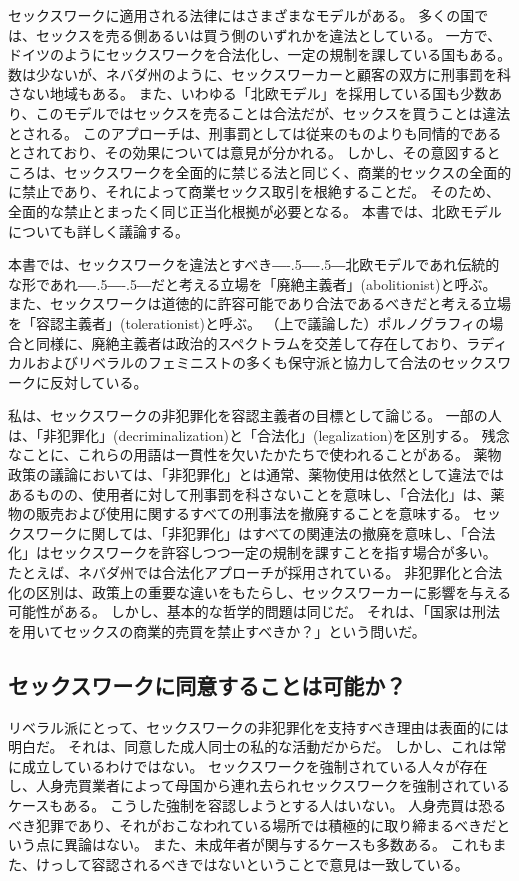 \documentclass[paper=a4,book,openany]{jlreq}
\def\DDASH{―\kern-.5\zw―\kern-.5\zw―}
\begin{document}
セックスワークに適用される法律にはさまざまなモデルがある。
多くの国では、セックスを売る側あるいは買う側のいずれかを違法としている。
一方で、ドイツのようにセックスワークを合法化し、一定の規制を課している国もある。
数は少ないが、ネバダ州のように、セックスワーカーと顧客の双方に刑事罰を科さない地域もある。
また、いわゆる「北欧モデル」を採用している国も少数あり、このモデルではセックスを売ることは合法だが、セックスを買うことは違法とされる。
このアプローチは、刑事罰としては従来のものよりも同情的であるとされており、その効果については意見が分かれる。
しかし、その意図するところは、セックスワークを全面的に禁じる法と同じく、商業的セックスの全面的に禁止であり、それによって商業セックス取引を根絶することだ。
そのため、全面的な禁止とまったく同じ正当化根拠が必要となる。
本書では、北欧モデルについても詳しく議論する。

本書では、セックスワークを違法とすべき{\DDASH}北欧モデルであれ伝統的な形であれ{\DDASH}だと考える立場を「廃絶主義者」(abolitionist)と呼ぶ。
また、セックスワークは道徳的に許容可能であり合法であるべきだと考える立場を「容認主義者」(tolerationist)と呼ぶ。
（上で議論した）ポルノグラフィの場合と同様に、廃絶主義者は政治的スペクトラムを交差して存在しており、ラディカルおよびリベラルのフェミニストの多くも保守派と協力して合法のセックスワークに反対している。

私は、セックスワークの非犯罪化を容認主義者の目標として論じる。
一部の人は、「非犯罪化」(decriminalization)と「合法化」(legalization)を区別する。
残念なことに、これらの用語は一貫性を欠いたかたちで使われることがある。
薬物政策の議論においては、「非犯罪化」とは通常、薬物使用は依然として違法ではあるものの、使用者に対して刑事罰を科さないことを意味し、「合法化」は、薬物の販売および使用に関するすべての刑事法を撤廃することを意味する。
セックスワークに関しては、「非犯罪化」はすべての関連法の撤廃を意味し、「合法化」はセックスワークを許容しつつ一定の規制を課すことを指す場合が多い。
たとえば、ネバダ州では合法化アプローチが採用されている。
非犯罪化と合法化の区別は、政策上の重要な違いをもたらし、セックスワーカーに影響を与える可能性がある。
しかし、基本的な哲学的問題は同じだ。
それは、「国家は刑法を用いてセックスの商業的売買を禁止すべきか？」という問いだ\citep{tani15:_sex_worker_explain_differ_legal_decrim_prost}。

\subsection{セックスワークに同意することは可能か？}

リベラル派にとって、セックスワークの非犯罪化を支持すべき理由は表面的には明白だ。
それは、同意した成人同士の私的な活動だからだ。
しかし、これは常に成立しているわけではない。
セックスワークを強制されている人々が存在し、人身売買業者によって母国から連れ去られセックスワークを強制されているケースもある。
こうした強制を容認しようとする人はいない。
人身売買は恐るべき犯罪であり、それがおこなわれている場所では積極的に取り締まるべきだという点に異論はない。
また、未成年者が関与するケースも多数ある。
これもまた、けっして容認されるべきではないということで意見は一致している。
\end{document}
